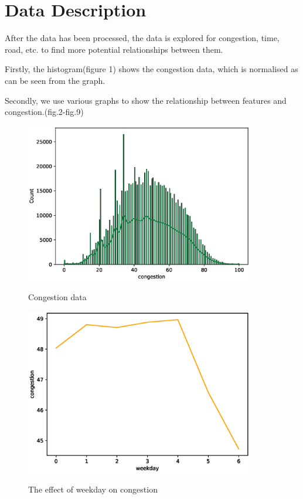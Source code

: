 \section{Data Description} \label{datadescription}
After the data has been processed, the data is explored for congestion, time, road, etc. to find more potential relationships between them.\par
Firstly, the histogram(figure 1) shows the congestion data, which is normalised as can be seen from the graph.\par
Secondly, we use various graphs to show the relationship between features and congestion.(fig.2-fig.9)
\begin{figure}
	\setlength{\abovecaptionskip}{-0.1cm} 
	\includegraphics[width=10cm]{figure/congestion.eps}\\	
	\caption{Congestion data}
	\label{Congestion data}
\end{figure}

\begin{center}
	\begin{figure}[h]
		\setlength{\abovecaptionskip}{-0.1cm} 
		\includegraphics[width=10cm]{figure/weekday.eps}\\	
		\caption{The effect of weekday on congestion}
		\label{weekday}
	\end{figure}
\end{center}

